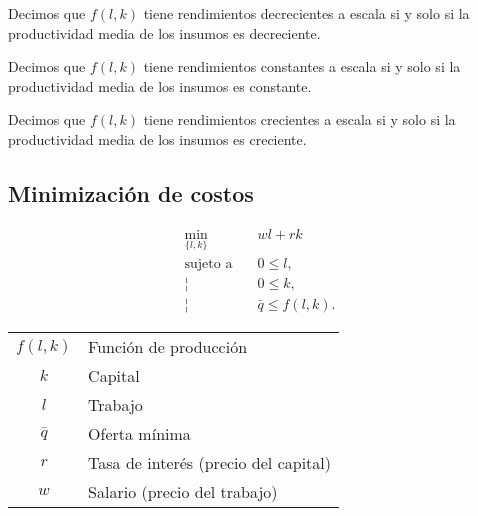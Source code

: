 \documentclass[8pt,a4paper]{extarticle}
\begin{document}
\begin{multicols}{3}
\begin{boxprop}
	Decimos que $f(l, k)$ tiene rendimientos decrecientes a escala si y solo si la productividad media de los insumos es decreciente.
\end{boxprop}

\begin{boxprop}                                                                                                                                  
    Decimos que $f(l, k)$ tiene rendimientos constantes a escala si y solo si la productividad media de los insumos es constante.        
\end{boxprop}

\begin{boxprop}                                                                                                                                  
    Decimos que $f(l, k)$ tiene rendimientos crecientes a escala si y solo si la productividad media de los insumos es creciente.        
\end{boxprop}

\newpage

\subsection{Minimización de costos}

\begin{equation*}
\begin{aligned}
    \min_{\{l, k\}}\      & wl + rk \\
    \text{sujeto a} \quad & 0 \le l, \\
                        ¦ & 0 \le k, \\
						¦ & \bar{q} \le f(l, k).
\end{aligned}
\end{equation*}

\begin{center}
\begin{tabular}{ c l }
    \hline
	$f(l, k)$ & Función de producción \\
    $k$ & Capital \\
    $l$ & Trabajo \\
	$\bar{q}$ & Oferta mínima \\
	$r$ & Tasa de interés (precio del capital) \\
	$w$ & Salario (precio del trabajo) \\
    \hline
\end{tabular}
\end{center}


\end{multicols}
\end{document}
